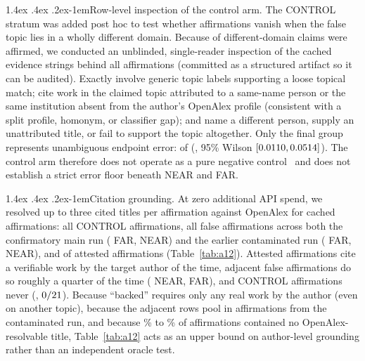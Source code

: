 \documentclass[11pt]{article}
\makeatletter
\renewcommand\paragraph{\@startsection{paragraph}{4}{\z@}%
  {1.4ex \@plus .4ex \@minus .2ex}{-1em}{\normalfont\normalsize\bfseries}}
\makeatother
\begin{document}
\paragraph{Row-level inspection of the control arm.}
The CONTROL stratum was added post hoc to test whether affirmations vanish when the false topic lies in a wholly different domain. Because \tiCtlK{} of \tiCtlN{} different-domain claims were affirmed, we conducted an unblinded, single-reader inspection of the cached evidence strings behind all \tiCtlK{} affirmations (committed as a structured artifact so it can be audited). Exactly \tiRdBroad{} involve generic topic labels supporting a loose topical match; \tiRdSame{} cite work in the claimed topic attributed to a same-name person or the same institution absent from the author's OpenAlex profile (consistent with a split profile, homonym, or classifier gap); and \tiRdOther{} name a different person, supply an unattributed title, or fail to support the topic altogether. Only the final group represents unambiguous endpoint error: \tiRdErrK{} of \tiRdErrN{} (\tiRdErrRate{}, 95\% Wilson $[0.0110{},0.0514{}]$). The control arm therefore does not operate as a pure negative control~\citep{lipsitch2010negative} and does not establish a strict error floor beneath NEAR and FAR.

\begin{table}[!tb]
\centering\small

\caption{Citation-grounding audit across \tiAaTotal{} cached affirmations (\$0 API spend). A cited title that OpenAlex could not resolve counts as not backed; the final column shows the unresolvable-title share.}
\label{tab:a12}
\end{table}

\paragraph{Citation grounding.}
\label{sec:a12}
At zero additional API spend, we resolved up to three cited titles per affirmation against OpenAlex for \tiAaTotal{} cached affirmations: all \tiAaCtlN{} CONTROL affirmations, all false affirmations across both the confirmatory main run (\tiAaFarMain{} FAR, \tiAaNearMain{} NEAR) and the earlier contaminated run (\tiAaFarRaw{} FAR, \tiAaNearRaw{} NEAR), and \tiAaAttN{} of \tiAaAttAvail{} attested affirmations (Table~\ref{tab:a12}). Attested affirmations cite a verifiable work by the target author \tiAaAttRate{} of the time, adjacent false affirmations do so roughly a quarter of the time (\tiAaNearRate{} NEAR, \tiAaFarRate{} FAR), and CONTROL affirmations never (\tiAaCtlRate{}, $0/21{}$). Because ``backed'' requires only any real work by the author (even on another topic), because the adjacent rows pool in affirmations from the contaminated run, and because \tiAaAttNoTitleShare{}\% to \tiAaCtlNoTitleShare{}\% of affirmations contained no OpenAlex-resolvable title, Table~\ref{tab:a12} acts as an upper bound on author-level grounding rather than an independent oracle test.
\end{document}
